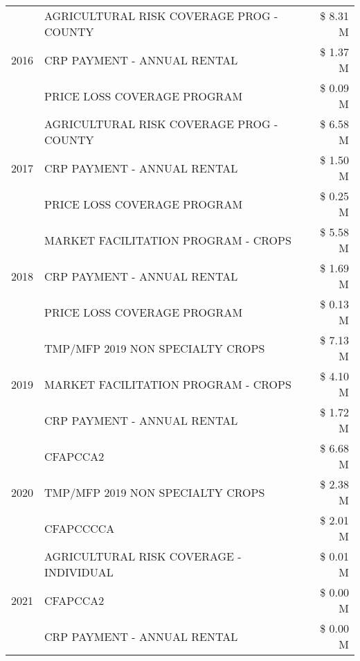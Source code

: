 \begin{tabular}{llr}
\cline{1-3}
\multirow[t]{3}{*}{2016} & AGRICULTURAL RISK COVERAGE PROG - COUNTY & \$ 8.31 M \\
 & CRP PAYMENT - ANNUAL RENTAL & \$ 1.37 M \\
 & PRICE LOSS COVERAGE PROGRAM & \$ 0.09 M \\
\cline{1-3}
\multirow[t]{3}{*}{2017} & AGRICULTURAL RISK COVERAGE PROG - COUNTY & \$ 6.58 M \\
 & CRP PAYMENT - ANNUAL RENTAL & \$ 1.50 M \\
 & PRICE LOSS COVERAGE PROGRAM & \$ 0.25 M \\
\cline{1-3}
\multirow[t]{3}{*}{2018} & MARKET FACILITATION PROGRAM - CROPS & \$ 5.58 M \\
 & CRP PAYMENT - ANNUAL RENTAL & \$ 1.69 M \\
 & PRICE LOSS COVERAGE PROGRAM & \$ 0.13 M \\
\cline{1-3}
\multirow[t]{3}{*}{2019} & TMP/MFP 2019 NON SPECIALTY CROPS & \$ 7.13 M \\
 & MARKET FACILITATION PROGRAM - CROPS & \$ 4.10 M \\
 & CRP PAYMENT - ANNUAL RENTAL & \$ 1.72 M \\
\cline{1-3}
\multirow[t]{3}{*}{2020} & CFAPCCA2 & \$ 6.68 M \\
 & TMP/MFP 2019 NON SPECIALTY CROPS & \$ 2.38 M \\
 & CFAPCCCCA & \$ 2.01 M \\
\cline{1-3}
\multirow[t]{3}{*}{2021} & AGRICULTURAL RISK COVERAGE - INDIVIDUAL & \$ 0.01 M \\
 & CFAPCCA2 & \$ 0.00 M \\
 & CRP PAYMENT - ANNUAL RENTAL & \$ 0.00 M \\
\cline{1-3}
\bottomrule
\end{tabular}

